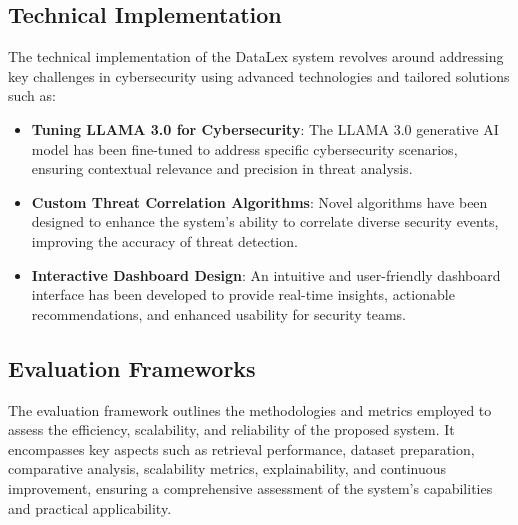 \subsection{Technical Implementation}
\label{subsec_technical_implementation}

The technical implementation of the DataLex system revolves around addressing key challenges in cybersecurity using advanced technologies and tailored solutions such as:

\begin{itemize}
    \item \textbf{Tuning LLAMA 3.0 for Cybersecurity}: The LLAMA 3.0 generative AI model has been fine-tuned to address specific cybersecurity scenarios, ensuring contextual relevance and precision in threat analysis.
    \item \textbf{Custom Threat Correlation Algorithms}: Novel algorithms have been designed to enhance the system's ability to correlate diverse security events, improving the accuracy of threat detection.
    \item \textbf{Interactive Dashboard Design}: An intuitive and user-friendly dashboard interface has been developed to provide real-time insights, actionable recommendations, and enhanced usability for security teams.
\end{itemize}

\subsection{Evaluation Frameworks}
\label{subsec_evaluation_frameworks}

The evaluation framework outlines the methodologies and metrics employed to assess the efficiency, scalability, and reliability of the proposed system. It encompasses key aspects such as retrieval performance, dataset preparation, comparative analysis, scalability metrics, explainability, and continuous improvement, ensuring a comprehensive assessment of the system's capabilities and practical applicability.

